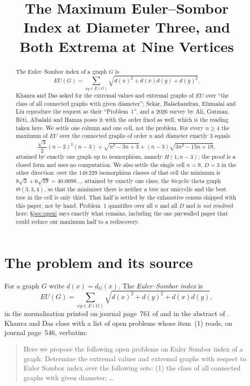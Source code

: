 \documentclass[11pt]{amsart}
\title[Euler--Sombor at diameter three]
{The Maximum Euler--Sombor Index at Diameter Three, and Both Extrema at Nine Vertices}
\date{}
\theoremstyle{remark}
\newcommand{\EU}{\mathit{EU}}
\begin{document}
\begin{abstract}
The Euler--Sombor index of a graph $G$ is
\[
 \EU(G)=\sum_{xy\in E(G)}\sqrt{d(x)^2+d(x)d(y)+d(y)^2}.
\]
Khanra and Das asked for the extremal values and extremal graphs of $\EU$
over ``the class of all connected graphs with given diameter''; Sekar,
Balachandran, Elumalai and Liu reproduce the request as their ``Problem~1'',
and a 2026 survey by Ali, Gutman, R\'eti, Albalahi and Hamza poses it with the
order fixed as well, which is the reading taken here. We settle one column and
one cell, not the problem. For every $n\ge4$ the maximum of $\EU$ over the
connected graphs of order $n$ and diameter exactly $3$ equals
\[
 \frac{\sqrt3}{2}(n-2)^2(n-3)+\sqrt{n^2-3n+3}+(n-3)\sqrt{3n^2-15n+19},
\]
attained by exactly one graph up to isomorphism, namely $H(1,n-3)$;
the proof is a closed form and uses no computation.
We also settle the single cell $n=9$, $D=3$ in the other direction: over the
$148\,229$ isomorphism classes of that cell the minimum is
$8\sqrt3+6\sqrt{19}=40.0098\ldots$, attained by exactly one class, the
\emph{bicyclic} theta graph $\Theta(3,3,4)$, so that the minimiser there is
neither a tree nor unicyclic and the best tree in the cell is only third. That
half is settled by the exhaustive census shipped with this paper, not by hand.
Problem~1 quantifies over all $n$ and all $D$ and is \emph{not} resolved here;
\S\ref{sec:open} says exactly what remains, including the one paywalled paper
that could reduce our maximum half to a rediscovery.
\end{abstract}

\maketitle

\section{The problem and its source}

For a graph $G$ write $d(x)=d_G(x)$. The \emph{Euler--Sombor index} is
\begin{equation}\label{eq:EU}
 \EU(G)=\sum_{xy\in E(G)}\sqrt{d(x)^2+d(y)^2+d(x)d(y)},
\end{equation}
in the normalisation printed on journal page~761 of \cite{Sekar} and in the
abstract of \cite{Kizilirmak}. Khanra and Das close \cite{KhanraDas} with a
list of open problems whose item~(1) reads, on journal page~546, verbatim:

\begin{quote}
Here we propose the following open problems on Euler Sombor index of a graph:
Determine the extremal values and extremal graphs with respect to Euler Sombor
index over the following sets: (1) the class of all connected graphs with given
diameter; \ldots
\end{quote}
\end{document}
